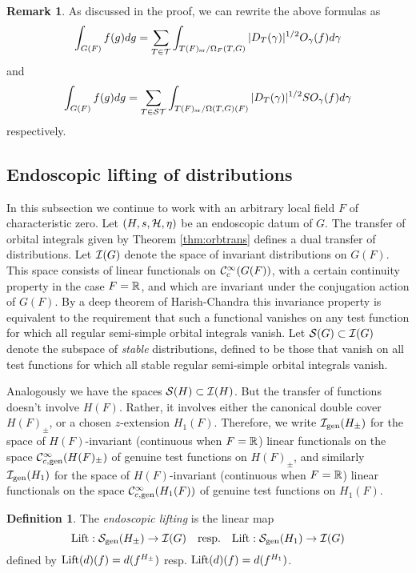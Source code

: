 \documentclass{article}
\theoremstyle{definition}
\newtheorem{dfn}[thm]{Definition}
\newtheorem{rem}[thm]{Remark}
\numberwithin{equation}{section}
\renewcommand{\-}{\hyp{}}
\begin{document}
\begin{rem} \label{rem:weyl1}
	As discussed in the proof, we can rewrite the above formulas as
	\[ \int_{G(F)}f(g)dg = \sum_{T \in \mathcal{T}}\int_{T(F)_{\textrm{sr}}/\Omega_F(T,G)} |D_T(\gamma)|^{1/2} O_\gamma(f)d\gamma \]
	and
	\[ \int_{G(F)}f(g)dg = \sum_{T \in \mathcal{ST}}\int_{T(F)_{\textrm{sr}}/\Omega(T,G)(F)} |D_T(\gamma)|^{1/2} SO_\gamma(f)d\gamma \]
	respectively.
\end{rem}

\subsection{Endoscopic lifting of distributions}

In this subsection we continue to work with an arbitrary local field $F$ of characteristic zero. Let $(H,s,\mathcal{H},\eta)$ be an endoscopic datum of $G$. The transfer of orbital integrals given by Theorem \ref{thm:orbtrans} defines a dual transfer of distributions. Let $\mathcal{I}(G)$ denote the space of invariant distributions on $G(F)$. This space consists of linear functionals on $\mathcal{C}^\infty_c(G(F))$, with a certain continuity property in the case $F=\mathbb{R}$, and which are invariant under the conjugation action of $G(F)$. By a deep theorem of Harish-Chandra this invariance property is equivalent to the requirement that such a functional vanishes on any test function for which all regular semi-simple orbital integrals vanish. Let $\mathcal{S}(G) \subset \mathcal{I}(G)$ denote the subspace of \emph{stable} distributions, defined to be those that vanish on all test functions for which all stable regular semi-simple orbital integrals vanish.

Analogously we have the spaces $\mathcal{S}(H) \subset \mathcal{I}(H)$. But the transfer of functions doesn't involve $H(F)$. Rather, it involves either the canonical double cover $H(F)_\pm$, or a chosen $z$-extension $H_1(F)$. Therefore, we write $\mathcal{I}_{\textrm{gen}}(H_\pm)$ for the space of $H(F)$-invariant (continuous when $F=\mathbb{R}$) linear functionals on the space $\mathcal{C}^\infty_{c,\textrm{gen}}(H(F)_\pm)$ of genuine test functions on $H(F)_\pm$, and similarly $\mathcal{I}_{\textrm{gen}}(H_1)$ for the space of $H(F)$-invariant (continuous when $F=\mathbb{R}$) linear functionals on the space $\mathcal{C}^\infty_{c,\textrm{gen}}(H_1(F))$ of genuine test functions on $H_1(F)$.

\begin{dfn} \label{dfn:stabtrans}
The \emph{endoscopic lifting} is the linear map 
\[ \textrm{Lift} : \mathcal{S}_{\textrm{gen}}(H_\pm) \to \mathcal{I}(G) \quad \textrm{resp.}\quad \textrm{Lift} : \mathcal{S}_{\textrm{gen}}(H_1) \to \mathcal{I}(G)\] 
defined by $\textrm{Lift}(d)(f)=d(f^{H_\pm})$ resp. $\textrm{Lift}(d)(f)=d(f^{H_1})$.
\end{dfn}
\end{document}
